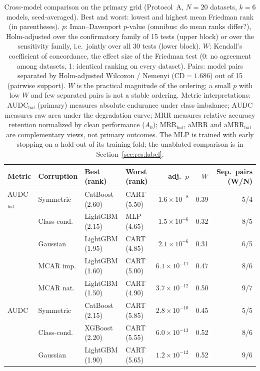\documentclass[pdflatex,sn-mathphys]{sn-jnl}
\theoremstyle{thmstyleone}
\theoremstyle{thmstyletwo}
\theoremstyle{thmstylethree}
\newcommand{\AUDC}{\mathrm{AUDC}}
\newcommand{\MRR}{\mathrm{MRR}}
\newcommand{\aMRR}{\mathrm{aMRR}}
\begin{document}
\begin{table}[t]
\centering
\footnotesize
\caption{Cross-model comparison on the primary grid (Protocol~A, $N=20$ datasets, $k=6$ models, seed-averaged). Best and worst: lowest and highest mean Friedman rank (in parentheses). $p$: Iman--Davenport $p$-value (omnibus: do mean ranks differ?), Holm-adjusted over the confirmatory family of 15 tests (upper block) or over the sensitivity family, i.e.\ jointly over all 30 tests (lower block). $W$: Kendall's coefficient of concordance, the effect size of the Friedman test (0: no agreement among datasets, 1: identical ranking on every dataset). Pairs: model pairs separated by Holm-adjusted Wilcoxon / Nemenyi (CD$=1.686$) out of 15 (pairwise support). $W$ is the practical magnitude of the ordering; a small $p$ with low $W$ and few separated pairs is not a stable ordering. Metric interpretations: $\AUDC_{\mathrm{bal}}$ (primary) measures absolute endurance under class imbalance; $\AUDC$ measures raw area under the degradation curve; $\MRR$ measures relative accuracy retention normalized by clean performance ($A_0$); $\MRR_{\mathrm{bal}}$, $\aMRR$ and $\aMRR_{\mathrm{bal}}$ are complementary views, not primary outcomes. The MLP is trained with early stopping on a hold-out of its training fold; the unablated comparison is in Section~\ref{sec:res:label}.}
\label{tab:combined}
\setlength{\tabcolsep}{4pt}
\begin{tabular}{@{}llllrrr@{}}
\toprule
Metric & Corruption & Best (rank) & Worst (rank) & adj.\ $p$ & $W$ & Sep.\ pairs (W/N) \\
\midrule
AUDC$_{\mathrm{bal}}$ & Symmetric & CatBoost (2.60) & CART (5.50) & $1.6\times10^{-8}$ & 0.39 & 5/4 \\
 & Class-cond. & LightGBM (2.15) & MLP (4.65) & $1.5\times10^{-6}$ & 0.32 & 8/5 \\
 & Gaussian & LightGBM (1.95) & CART (4.85) & $2.1\times10^{-6}$ & 0.31 & 6/5 \\
 & MCAR imp. & LightGBM (1.60) & CART (5.00) & $6.1\times10^{-11}$ & 0.47 & 8/6 \\
 & MCAR nat. & LightGBM (1.50) & CART (4.90) & $3.7\times10^{-12}$ & 0.50 & 9/7 \\
AUDC & Symmetric & CatBoost (2.15) & CART (5.85) & $2.8\times10^{-10}$ & 0.45 & 5/5 \\
 & Class-cond. & XGBoost (2.20) & CART (5.55) & $6.0\times10^{-13}$ & 0.52 & 8/6 \\
 & Gaussian & LightGBM (1.90) & CART (5.65) & $1.2\times10^{-12}$ & 0.52 & 9/6 \\

\end{tabular}
\end{table}
\end{document}
